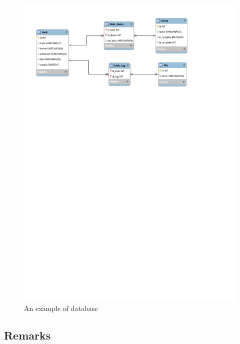 \begin{figure}[H]
  \centering
  \includegraphics[width=5in]{blobs/images/images_bdd}
  \caption{An example of database}
  \label{img:images_bdd}
\end{figure}

\subsection{Remarks}
